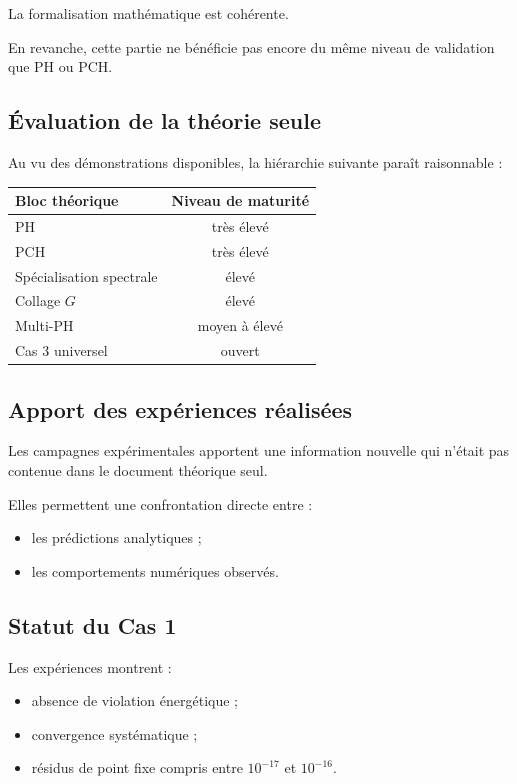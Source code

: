 La formalisation mathématique est cohérente.

En revanche, cette partie ne bénéficie pas encore du même niveau de validation que PH ou PCH.

\subsection{Évaluation de la théorie seule}

Au vu des démonstrations disponibles, la hiérarchie suivante paraît raisonnable :

\begin{center}
\begin{tabular}{lc}
\hline
Bloc théorique & Niveau de maturité \\
\hline
PH & très élevé \\
PCH & très élevé \\
Spécialisation spectrale & élevé \\
Collage \(G\) & élevé \\
Multi-PH & moyen à élevé \\
Cas 3 universel & ouvert \\
\hline
\end{tabular}
\end{center}

\subsection{Apport des expériences réalisées}

Les campagnes expérimentales apportent une information nouvelle qui n'était pas contenue dans le document théorique seul.

Elles permettent une confrontation directe entre :

\begin{itemize}
    \item les prédictions analytiques ;
    \item les comportements numériques observés.
\end{itemize}

\subsection{Statut du Cas 1}

Les expériences montrent :

\begin{itemize}
    \item absence de violation énergétique ;
    \item convergence systématique ;
    \item résidus de point fixe compris entre \(10^{-17}\) et \(10^{-16}\).
\end{itemize}

